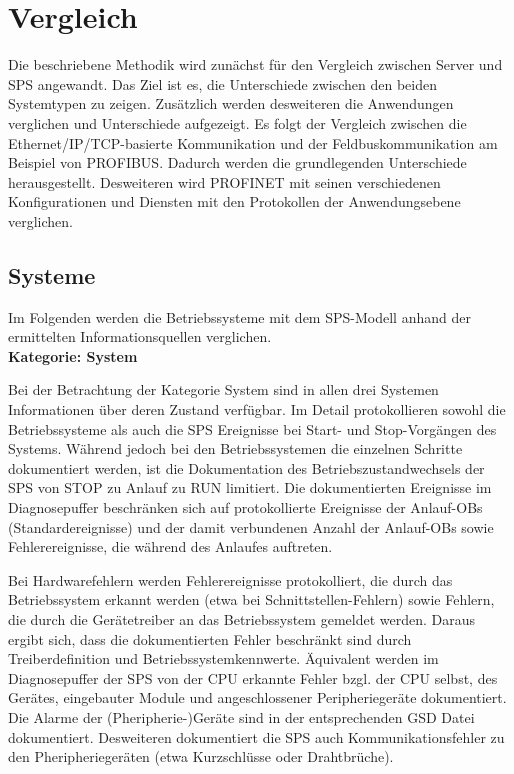 \section{Vergleich}
Die beschriebene Methodik wird zunächst für den Vergleich zwischen Server und SPS angewandt. Das Ziel ist es, die Unterschiede zwischen den beiden Systemtypen zu zeigen. Zusätzlich werden desweiteren die Anwendungen verglichen und Unterschiede aufgezeigt. Es folgt der Vergleich zwischen die Ethernet/IP/TCP-basierte Kommunikation und der Feldbuskommunikation am Beispiel von PROFIBUS. Dadurch werden die grundlegenden Unterschiede herausgestellt. Desweiteren wird PROFINET mit seinen verschiedenen Konfigurationen und Diensten mit den Protokollen der Anwendungsebene verglichen.

\subsection{Systeme}
Im Folgenden werden die Betriebssysteme mit dem SPS-Modell anhand der ermittelten Informationsquellen verglichen.\\

\textbf{Kategorie: System}

Bei der Betrachtung der Kategorie \glqq System\grqq{} sind in allen drei Systemen Informationen über deren Zustand verfügbar. Im Detail protokollieren sowohl die Betriebssysteme als auch die SPS Ereignisse bei Start- und Stop-Vorgängen des Systems. Während jedoch bei den Betriebssystemen die einzelnen Schritte dokumentiert werden, ist die Dokumentation des Betriebszustandwechsels der SPS von STOP zu Anlauf zu RUN limitiert. Die dokumentierten Ereignisse im Diagnosepuffer beschränken sich auf protokollierte Ereignisse der Anlauf-OBs (Standardereignisse) und der damit verbundenen Anzahl der Anlauf-OBs sowie Fehlerereignisse, die während des Anlaufes auftreten. 

Bei Hardwarefehlern werden Fehlerereignisse protokolliert, die durch das Betriebssystem erkannt werden (etwa bei Schnittstellen-Fehlern) sowie Fehlern, die durch die Gerätetreiber an das Betriebssystem gemeldet werden. Daraus ergibt sich, dass die dokumentierten Fehler beschränkt sind durch Treiberdefinition und Betriebssystemkennwerte. Äquivalent werden im Diagnosepuffer der SPS von der CPU erkannte Fehler bzgl. der CPU selbst, des Gerätes, eingebauter Module und angeschlossener Peripheriegeräte dokumentiert. Die Alarme der (Pheripherie-)Geräte sind in der entsprechenden GSD Datei dokumentiert. Desweiteren dokumentiert die SPS auch Kommunikationsfehler zu den Pheripheriegeräten (etwa Kurzschlüsse oder Drahtbrüche).

